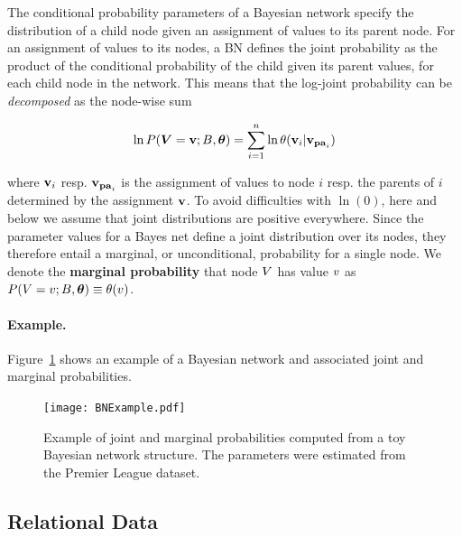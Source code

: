 \documentclass[conference]{IEEEtran}
\begin{document}
The conditional probability parameters of a Bayesian network specify the distribution of a child node given an assignment of values to its parent node. For an assignment of values to its nodes, a BN defines the joint probability as the product of the conditional probability of the child given its parent values, for each child node in the network. This means that the log-joint probability can be {\em decomposed} as the node-wise sum

\begin{equation} \label{eq:bn}
\ln P(\Features = \set{\nodevalue};\model,\parameters) = \sum_{i=1}^{n} \ln \parameter(\set{\nodevalue}_{i}|\set{\nodevalue}_{\parents_{i}})
\end{equation}

where $\mathbf{v}_{i}$ resp. $\mathbf{v}_{\mathbf{pa}_{i}}$ is the assignment of values to node $i$ resp. the parents of $i$ determined by the assignment $\mathbf{v}$. 
To avoid difficulties with $\ln(0)$, here and below we assume that joint distributions are positive everywhere. Since the parameter values for a Bayes net define a joint distribution over its nodes, they therefore entail a marginal, or unconditional, probability for a single node. We denote the \textbf{marginal probability} that node $V$ has value $v$ as $P(V = v;B,\boldsymbol{\theta}) \equiv \theta(v)$.

\paragraph{Example.} Figure~\ref{fig:bns} shows an example of a Bayesian network and associated joint and marginal probabilities.
\begin{figure}[htbp]
	\centering
	\texttt{[image: BNExample.pdf]}
	\caption{Example of joint and marginal probabilities computed from a toy Bayesian network structure. The parameters were estimated from the  Premier League dataset.
		\label{fig:bns}}
\end{figure}

\subsection{Relational Data}



\end{document}
